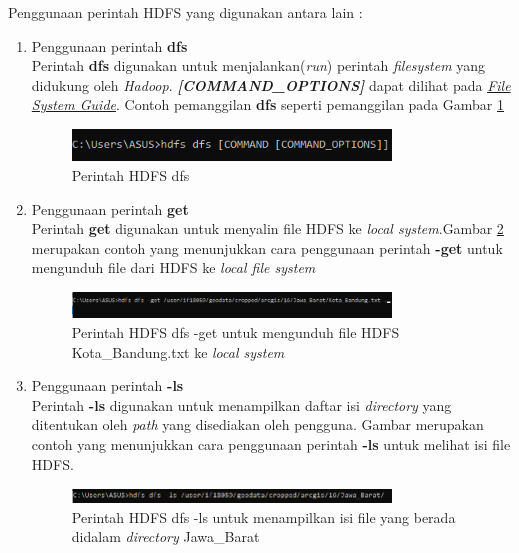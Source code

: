 Penggunaan perintah HDFS yang digunakan antara lain :
\begin{enumerate}
	\item Penggunaan perintah \textbf{dfs}\\
	Perintah \textbf{dfs} digunakan untuk menjalankan(\textit{run}) perintah \textit{filesystem} yang didukung oleh \textit{Hadoop}. \textit{\textbf{[COMMAND\_OPTIONS]}} dapat dilihat pada \href{https://hadoop.apache.org/docs/stable/hadoop-project-dist/hadoop-common/FileSystemShell.html}{\textit{File System Guide}}. Contoh pemanggilan \textbf{dfs} seperti pemanggilan pada Gambar \ref{fig:dfs}
	\begin{figure}[H]
		\centering
		\includegraphics[width=0.8\textwidth]{Gambar/dfs.png}
		\caption{Perintah HDFS dfs}
		\label{fig:dfs}
	\end{figure}
	\item Penggunaan perintah \textbf{get}\\
	Perintah \textbf{get} digunakan untuk menyalin file HDFS ke \textit{local system}.Gambar \ref{fig:get} merupakan contoh yang menunjukkan cara penggunaan perintah \textbf{-get} untuk mengunduh file dari HDFS ke \textit{local file system}
	\begin{figure}[H]
		\centering
		\includegraphics[width=0.8\textwidth]{Gambar/get.png}
		\caption{Perintah HDFS dfs -get untuk mengunduh file HDFS Kota\_Bandung.txt ke \textit{local system}}
		\label{fig:get}
	\end{figure}
	\item Penggunaan perintah \textbf{-ls}\\
	Perintah \textbf{-ls} digunakan untuk menampilkan daftar isi \textit{directory} yang ditentukan oleh \textit{path} yang disediakan oleh pengguna. Gambar merupakan contoh yang menunjukkan cara penggunaan perintah \textbf{-ls} untuk melihat isi file HDFS.
	\begin{figure}[H]
		\centering
		\includegraphics[width=0.8\textwidth]{Gambar/ls.png}
		\caption{Perintah HDFS dfs -ls untuk menampilkan isi file yang berada didalam \textit{directory} Jawa\_Barat}
		\label{fig:ls}
	\end{figure}
\end{enumerate}



